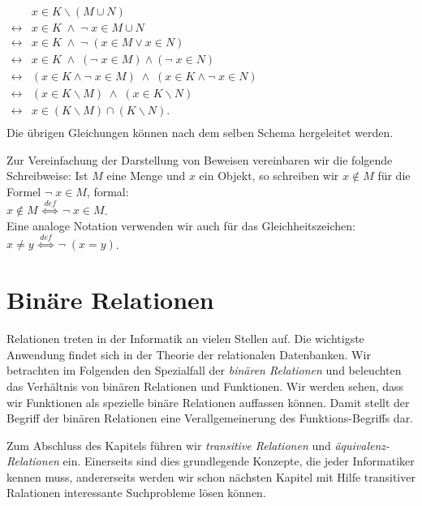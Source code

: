 \hspace*{1.3cm} $
\begin{array}{ll}
                & x \in K \backslash (M \cup N)        \\
\leftrightarrow & x \in K \;\wedge\; \neg\; x \in M \cup N \\
\leftrightarrow & x \in K \;\wedge\; \neg\; (x \in M \vee x \in N) \\
\leftrightarrow & x \in K \;\wedge\;  (\neg\; x \in M) \wedge (\neg\; x \in N) \\
\leftrightarrow & (x \in K \wedge \neg\;x \in M) \;\wedge\; (x \in K \wedge \neg\;x \in N) \\
\leftrightarrow & (x \in K \backslash M) \;\wedge\; (x \in K \backslash N) \\
\leftrightarrow & x \in (K \backslash M) \cap (K \backslash N). \\
\end{array}$ \\[0.3cm]
Die \"{u}brigen Gleichungen k\"{o}nnen nach dem selben Schema hergeleitet werden.

\noindent
Zur Vereinfachung der Darstellung von Beweisen vereinbaren wir die folgende Schreibweise:
Ist $M$ eine Menge und $x$ ein Objekt, so schreiben wir $x \notin M$  f\"{u}r
die Formel $\neg\; x \in M$, formal: \\[0.2cm]
\hspace*{1.3cm} $x \notin M \;\stackrel{de\!f}{\Longleftrightarrow}\; \neg\; x \in M$.
\\[0.2cm]
Eine analoge Notation verwenden wir auch f\"{u}r das Gleichheitszeichen:
\\[0.2cm]
\hspace*{1.3cm} 
$x \not= y \;\stackrel{de\!f}{\Longleftrightarrow}\; \neg\; (x = y)$.

\section{Bin\"{a}re Relationen}
Relationen treten in der Informatik an vielen Stellen auf.  Die wichtigste
Anwendung findet sich in der Theorie der relationalen Datenbanken.
Wir betrachten im Folgenden den Spezialfall der \emph{bin\"{a}ren Relationen} und beleuchten
das Verh\"{a}ltnis von bin\"{a}ren Relationen und Funktionen. Wir werden sehen, dass wir
Funktionen als spezielle bin\"{a}re Relationen auffassen k\"{o}nnen.  Damit stellt der Begriff der
bin\"{a}ren Relationen eine Verallgemeinerung des Funktions-Begriffs dar.

Zum Abschluss des Kapitels f\"{u}hren wir \emph{transitive Relationen} und
\emph{\"{a}quivalenz-Relationen} ein.  Einerseits sind dies grundlegende Konzepte, die jeder Informatiker
kennen muss, andererseits werden wir schon n\"{a}chsten Kapitel mit Hilfe transitiver Ralationen
interessante Suchprobleme l\"{o}sen k\"{o}nnen.


